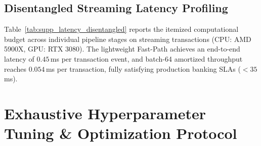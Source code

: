 \documentclass[journal,twoside]{IEEEtran}
\begin{document}
\subsection{Disentangled Streaming Latency Profiling}

Table~\ref{tab:supp_latency_disentangled} reports the itemized computational budget across individual pipeline stages on streaming transactions (CPU: AMD 5900X, GPU: RTX 3080). The lightweight Fast-Path achieves an end-to-end latency of $0.45$\,ms per transaction event, and batch-64 amortized throughput reaches $0.054$\,ms per transaction, fully satisfying production banking SLAs ($< 35$\,ms).

\begin{table}[htbp]
\centering
\caption{Fine-Grained Latency Profiling per Transaction Event (CPU: AMD 5900X, GPU: RTX 3080).}
\label{tab:supp_latency_disentangled}
\end{table}

\section{Exhaustive Hyperparameter Tuning \& Optimization Protocol}
\label{sec:supp_hyperparameters}
\end{document}
